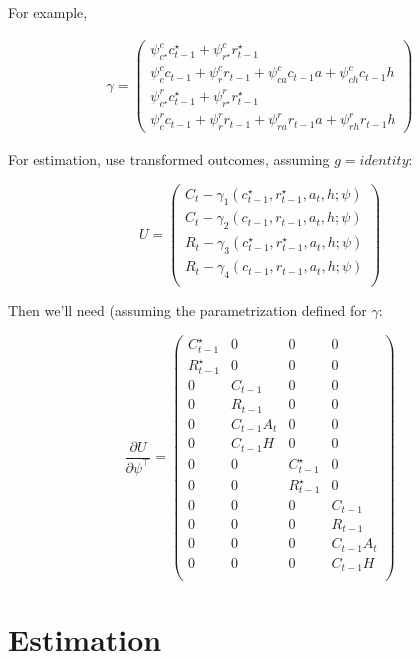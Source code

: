 \documentclass[]{article}
\begin{document}
For example,

\begin{align*} 
\gamma = 
\begin{pmatrix}
\psi^c_{c^{\star}} c^{\star}_{t-1} + \psi^c_{r^{\star}} r^{\star}_{t-1} \\
\psi^c_{c} c_{t-1} + \psi^c_{r} r_{t-1} + \psi^c_{ca} c_{t-1} a + \psi^c_{ch} c_{t-1} h \\
\psi^r_{c^{\star}} c^{\star}_{t-1} + \psi^r_{r^{\star}} r^{\star}_{t-1} \\
\psi^r_{c} c_{t-1} + \psi^r_{r} r_{t-1} + \psi^r_{ra} r_{t-1} a + \psi^r_{rh} r_{t-1} h
\end{pmatrix}
\end{align*}

For estimation, use transformed outcomes, assuming \(g = identity\):

\[
U =
\begin{pmatrix}
C_t  - \gamma_1(c^{\star}_{t-1}, r^{\star}_{t-1}, a_t, h; \psi) \\
C_t  - \gamma_2(c_{t-1}, r_{t-1}, a_t, h; \psi)  \\
R_t  - \gamma_3(c^{\star}_{t-1}, r^{\star}_{t-1}, a_t, h; \psi) \\
R_t  - \gamma_4(c_{t-1}, r_{t-1}, a_t, h; \psi)  \\
\end{pmatrix}
\]

Then we'll need (assuming the parametrization defined for \(\gamma\):

\[
\frac{\partial U}{\partial \psi^{\intercal}} = 
\begin{pmatrix}
C^{\star}_{t-1} & 0 & 0 & 0 \\
R^{\star}_{t-1} & 0 & 0 & 0 \\
0 & C_{t-1} & 0 & 0 \\
0 & R_{t-1} & 0 & 0 \\
0 & C_{t-1} A_t & 0 & 0 \\
0 & C_{t-1} H & 0 & 0 \\
0 & 0 & C^{\star}_{t-1} & 0 \\
0 & 0 & R^{\star}_{t-1} & 0 \\
0 & 0 & 0 & C_{t-1}  \\
0 & 0 & 0 & R_{t-1} \\
0 & 0 & 0 & C_{t-1} A_t  \\
0 & 0 & 0 & C_{t-1} H   \\
\end{pmatrix}
\]

\hypertarget{estimation}{%
\section{Estimation}\label{estimation}}
\end{document}
